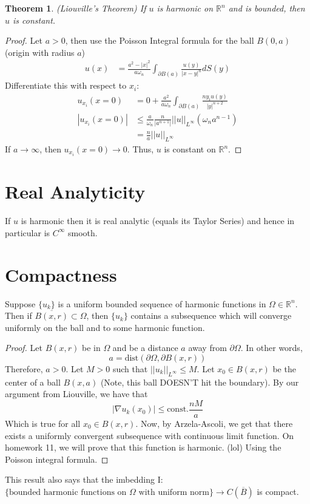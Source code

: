 \documentclass{article}
\newtheorem{theorem}{Theorem}[section]
\newtheorem{one minute paper}[theorem]{One Minute Paper}
\begin{document}
\begin{theorem}
    (Liouville's Theorem) If $u$ is harmonic on $\mathbb{R}^n$ and is bounded, then $u$ is constant.
\end{theorem}

\begin{proof}
    Let $a > 0$, then use the Poisson Integral formula for the ball $B(0,a)$ (origin with radius $a$)
    \begin{align}
        u(x) &= \frac{a^2 - |x|^2}{a \omega_n}\int_{\partial B(a)}\frac{u(y)}{|x-y|^n}dS(y)
    \end{align}
    Differentiate this with respect to $x_i$:
    \begin{align}
        u_{x_i}(x=0) &= 0 + \frac{a^2}{a \omega_n}\int_{\partial B(a)}\frac{ny_iu(y)}{|y|^{n+2}}\\
        |u_{x_i}(x=0)| &\leq \frac{a}{\omega_n}\frac{n}{|a^{n+1}|} ||u||_{L^{\infty}} (\omega_n a^{n-1})\\
        &= \frac{n}{a}||u||_{L^{\infty}}
    \end{align}
    If $a \rightarrow \infty$, then $u_{x_i}(x=0) \rightarrow 0$. Thus, $u$ is constant on $\mathbb{R}^n$. 
\end{proof}

\section*{Real Analyticity}

If $u$ is harmonic then it is real analytic (equals its Taylor Series) and hence in particular is $C^{\infty}$ smooth. 

\section*{Compactness}

Suppose $\{u_k\}$ is a uniform bounded sequence of harmonic functions in $\Omega \in \mathbb{R}^n$. Then if $\overline{B(x,r)} \subset \Omega$, then $\{u_k\}$ contains a 
subsequence which will converge uniformly on the ball and to some harmonic function. 

\begin{proof}
    Let $B(x,r)$ be in $\Omega$ and be a distance $a$ away from $\partial \Omega$. In other words, 
    \begin{equation}
        a = \text{dist}(\partial \Omega, \partial B(x,r))
    \end{equation}
    Therefore, $a > 0$. Let $M > 0$ such that $||u_k||_{L^{\infty}} \leq M$. Let $x_0 \in B(x,r)$ be the center of a ball $B(x,a)$ (Note, this ball DOESN'T hit the boundary). 
    By our argument from Liouville, we have that 
    \begin{equation}
        |\nabla u _k(x_0) | \leq \text{const.}\frac{nM}{a}
    \end{equation}
    Which is true for all $x_0 \in B(x,r)$. Now, by Arzela-Ascoli, we get that there exists a 
    uniformly convergent subsequence with continuous limit function. On homework 11, we will prove that this function is harmonic. (lol) Using the Poisson integral formula. 
\end{proof}

This result also says that the imbedding I: $\{\text{bounded harmonic functions on $\Omega$ with uniform norm}\} \rightarrow C(\overline{B})$ is compact. 
\end{document}
